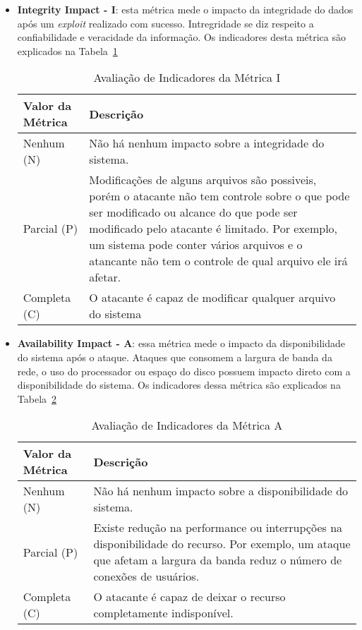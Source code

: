 \begin{itemize}
\begin{table}[H]
\begin{center}
	\end{center}
	\end{table}
\item \textbf{Integrity Impact - I}: esta métrica mede o impacto da integridade do dados após um \emph{exploit} realizado com sucesso. Intregridade se diz respeito a confiabilidade e veracidade da informação. Os indicadores desta métrica são explicados na Tabela~\ref{tab:i_scoring}
	\begin{table}[H]
	\begin{center}
	    \begin{tabular}{ | l | p{10cm} |}
	    \hline
	    Valor da Métrica & Descrição \\ \hline
	    Nenhum (N) & Não há nenhum impacto sobre a integridade do sistema. \\ \hline
	    Parcial (P) & Modificações de alguns arquivos são possiveis, porém o atacante não tem controle sobre o que pode ser modificado ou alcance do que pode ser modificado pelo atacante é limitado. Por exemplo, um sistema pode conter vários arquivos e o atancante não tem o controle de qual arquivo ele irá afetar.  \\ \hline
	    Completa (C) & O atacante é capaz de modificar qualquer arquivo do sistema\\ \hline
	    \end{tabular}
	    \caption{Avaliação de Indicadores da Métrica I}
	    \label{tab:i_scoring}
	\end{center}
	\end{table}
\item \textbf{Availability Impact - A}: essa métrica mede o impacto da disponibilidade do sistema após o ataque. Ataques que consomem a largura de banda da rede, o uso do processador ou espaço do disco possuem impacto direto com a disponibilidade do sistema. Os indicadores dessa métrica são explicados na Tabela~\ref{tab:a_scoring}
	\begin{table}[H]
	\begin{center}
	    \begin{tabular}{ | l | p{10cm} |}
	    \hline
	    Valor da Métrica & Descrição \\ \hline
	    Nenhum (N) & Não há nenhum impacto sobre a disponibilidade do sistema. \\ \hline
	    Parcial (P) & Existe redução na performance ou interrupções na disponibilidade do recurso. Por exemplo, um ataque que afetam a largura da banda reduz o número de conexões de usuários.\\ \hline
	    Completa (C) & O atacante é capaz de deixar o recurso completamente indisponível.\\ \hline
	    \end{tabular}
	    \caption{Avaliação de Indicadores da Métrica A}
	    \label{tab:a_scoring}
	\end{center}
	\end{table}
\end{itemize}

